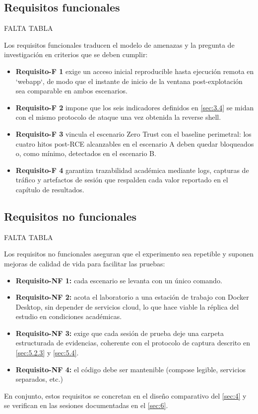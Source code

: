 \documentclass[11pt,spanish,listoffigures,listoftables]{tfgetsinf}
\begin{document}
        \subsection{Requisitos funcionales}
        \label{sec:3.3.1}
        FALTA TABLA
        
        Los requisitos funcionales traducen el modelo de amenazas y la pregunta de investigación en criterios que se deben cumplir:
        \begin{itemize}
            \item \textbf{Requisito-F 1} exige un acceso inicial reproducible hasta ejecución remota en `webapp`, de modo que el instante de inicio de la ventana post-explotación sea comparable en ambos escenarios.
            \item \textbf{Requisito-F 2} impone que los seis indicadores definidos en \cref{sec:3.4} se midan con el mismo protocolo de ataque una vez obtenida la reverse shell.
            \item \textbf{Requisito-F 3} vincula el escenario Zero Trust con el baseline perimetral: los cuatro hitos post-RCE alcanzables en el escenario A deben quedar bloqueados o, como mínimo, detectados en el escenario B.
            \item \textbf{Requisito-F 4} garantiza trazabilidad académica mediante logs, capturas de tráfico y artefactos de sesión que respalden cada valor reportado en el capítulo de resultados.
        \end{itemize}
        
        \subsection{Requisitos no funcionales}
        FALTA TABLA
        
        Los requisitos no funcionales aseguran que el experimento sea repetible y suponen mejoras de calidad de vida para facilitar las pruebas:
        \begin{itemize}
            \item \textbf{Requisito-NF 1:} cada escenario se levanta con un único comando.
            \item \textbf{Requisito-NF 2:} acota el laboratorio a una estación de trabajo con Docker Desktop, sin depender de servicios cloud, lo que hace viable la réplica del estudio en condiciones académicas.
            \item \textbf{Requisito-NF 3:} exige que cada sesión de prueba deje una carpeta estructurada de evidencias, coherente con el protocolo de captura descrito en \cref{sec:5.2.3} y \cref{sec:5.4}.
            \item \textbf{Requisito-NF 4:} el código debe ser mantenible (compose legible, servicios separados, etc.)
        \end{itemize}
        En conjunto, estos requisitos se concretan en el diseño comparativo del \cref{sec:4} y se verifican en las sesiones documentadas en el \cref{sec:6}.
        
\end{document}
